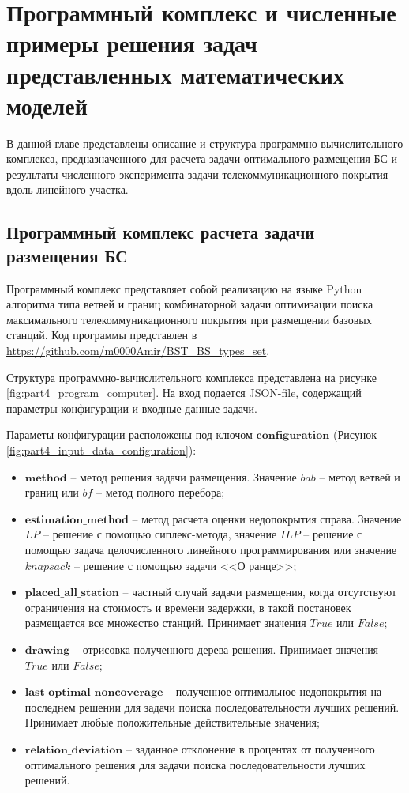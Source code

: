 \chapter{Программный комплекс и численные примеры решения задач представленных математических моделей}\label{part4}

В данной главе представлены описание и структура программно-вычислительного комплекса, предназначенного для расчета задачи оптимального размещения БС и результаты численного эксперимента задачи телекоммуникационного покрытия вдоль линейного участка.

\section{Программный комплекс расчета задачи размещения БС}

Программный комплекс \cite{progbib_mukhtarpov} представляет собой реализацию на языке Python алгоритма типа ветвей и границ комбинаторной задачи оптимизации поиска максимального телекоммуникационного покрытия при размещении базовых станций. Код программы представлен в \url{https://github.com/m0000Amir/BST_BS_types_set}.

Структура программно-вычислительного комплекса представлена на рисунке \ref{fig:part4_program_computer}. На вход подается JSON-file, содержащий параметры конфигурации и входные данные задачи.

 Параметы конфигурации расположены под ключом $\textbf{configuration}$ (Рисунок \cref{fig:part4_input_data_configuration}):
 \begin{itemize}
   \item $\textbf{method}$ -- метод решения задачи размещения. Значение $\textit{bab}$ -- метод ветвей и границ или $\textit{bf}$  -- метод полного перебора;
   \item $\textbf{estimation\_method}$ -- метод расчета оценки недопокрытия справа. Значение $\textit{LP}$ -- решение с помощью сиплекс-метода, значение $\textit{ILP}$ -- решение с помощью задача целочисленного линейного программирования или значение $\textit{knapsack}$ -- решение с помощью задачи <<О ранце>>;
   \item $\textbf{placed\_all\_station}$ -- частный случай задачи размещения, когда отсутствуют ограничения на стоимость и времени задержки, в такой постановек размещается все множество станций. Принимает значения $\textit{True}$ или $\textit{False}$;
   \item $\textbf{drawing}$ -- отрисовка полученного дерева решения.  Принимает значения $\textit{True}$ или $\textit{False}$;
   \item $\textbf{last\_optimal\_noncoverage}$ -- полученное оптимальное недопокрытия на последнем решении  для задачи поиска последовательности лучших решений. Принимает любые положительные действительные значения;
   \item $\textbf{relation\_deviation}$ -- заданное отклонение в процентах от полученного оптимального решения для задачи поиска последовательности лучших решений.
 \end{itemize}



